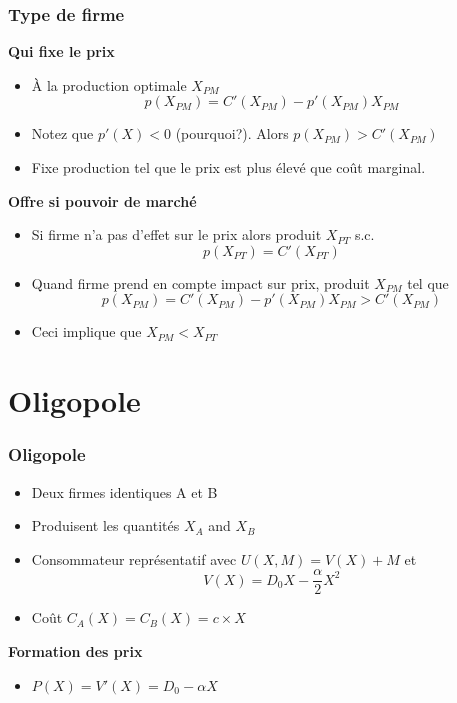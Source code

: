 \documentclass[handout]{beamer}
\newenvironment{iPar}[1]{\textbf{#1} \begin{itemize}}{\end{itemize}}
\newcommand{\mdp}{\medskip \pause}
\begin{document}
\begin{frame}\frametitle{Type de firme}



\begin{iPar}{Qui fixe le prix} \item À la
production optimale $X_{PM}$ $$p(X_{PM}) = C'(X_{PM}) - p'(X_{PM})X_{PM}$$ \item Notez que $p'(X) < 0$ (pourquoi?).
Alors $ p(X_{PM}) > C'(X_{PM})$ \item Fixe production tel que le prix est plus élevé que coût marginal. \end{iPar}\mdp

\begin{iPar}{Offre si pouvoir de marché} \item Si firme n'a pas d'effet sur le prix alors produit $X_{PT}$ s.c. $$p(X_{PT}) = C'(X_{PT})$$ \item Quand firme prend en compte impact sur prix, produit $X_{PM}$ tel que  $$p(X_{PM}) =
C'(X_{PM}) - p'(X_{PM})X_{PM} > C'(X_{PM})$$ \item Ceci implique que $X_{PM} < X_{PT}$
\end{iPar}

\end{frame}



\section{Oligopole}


\begin{frame}\frametitle{Oligopole} \begin{itemize} \item
Deux firmes identiques A et B \item Produisent les quantités $X_A$ and $X_B$ \item Consommateur représentatif avec $U(X,M) =V(X) + M$ et $$ V(X) = D_0 X - \frac{\alpha}{2} X^2$$   \item Coût $C_A(X) = C_B(X)= c \times X$\end{itemize} \mdp

\begin{iPar}{Formation des prix}
\item  $P(X) = V'(X) = D_0 - \alpha X$
\end{iPar}
\end{frame}
\end{document}
